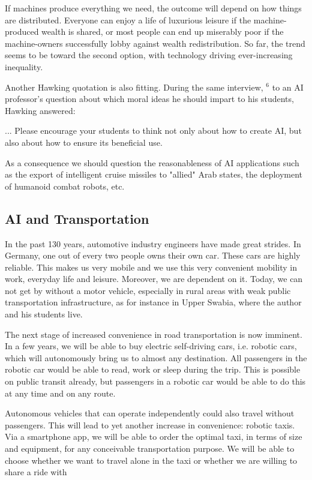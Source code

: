 \documentclass[10pt]{book}
\begin{document}
\begin{displayquote}
If machines produce everything we need, the outcome will depend on how things are distributed. Everyone can enjoy a life of luxurious leisure if the machine-produced wealth is shared, or most people can end up miserably poor if the machine-owners successfully lobby against wealth redistribution. So far, the trend seems to be toward the second option, with technology driving ever-increasing inequality.
\end{displayquote}

Another Hawking quotation is also fitting. During the same interview, ${ }^{6}$ to an AI professor's question about which moral ideas he should impart to his students, Hawking answered:

\begin{displayquote}
... Please encourage your students to think not only about how to create AI, but also about how to ensure its beneficial use.
\end{displayquote}

As a consequence we should question the reasonableness of AI applications such as the export of intelligent cruise missiles to "allied" Arab states, the deployment of humanoid combat robots, etc.

\subsection{AI and Transportation}
In the past 130 years, automotive industry engineers have made great strides. In Germany, one out of every two people owns their own car. These cars are highly reliable. This makes us very mobile and we use this very convenient mobility in work, everyday life and leisure. Moreover, we are dependent on it. Today, we can not get by without a motor vehicle, especially in rural areas with weak public transportation infrastructure, as for instance in Upper Swabia, where the author and his students live.

The next stage of increased convenience in road transportation is now imminent. In a few years, we will be able to buy electric self-driving cars, i.e. robotic cars, which will autonomously bring us to almost any destination. All passengers in the robotic car would be able to read, work or sleep during the trip. This is possible on public transit already, but passengers in a robotic car would be able to do this at any time and on any route.

Autonomous vehicles that can operate independently could also travel without passengers. This will lead to yet another increase in convenience: robotic taxis. Via a smartphone app, we will be able to order the optimal taxi, in terms of size and equipment, for any conceivable transportation purpose. We will be able to choose whether we want to travel alone in the taxi or whether we are willing to share a ride with
\end{document}
